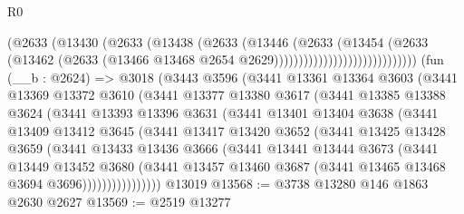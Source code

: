 \begin{lexlean}{R0}
\begin{coremodule}
                                      (@2633
                                        (@13430
                                          (@2633
                                            (@13438
                                              (@2633
                                                (@13446
                                                  (@2633
                                                    (@13454
                                                      (@2633
                                                        (@13462
                                                          (@2633
                                                            (@13466
                                                              @13468
                                                              @2654
                                                              @2629)))))))))))))))))))))))))))))
    (fun (__b : @2624) =>
    @3018
      (@3443
        @3596
        (@3441
          @13361
          @13364
          @3603
          (@3441
            @13369
            @13372
            @3610
            (@3441
              @13377
              @13380
              @3617
              (@3441
                @13385
                @13388
                @3624
                (@3441
                  @13393
                  @13396
                  @3631
                  (@3441
                    @13401
                    @13404
                    @3638
                    (@3441
                      @13409
                      @13412
                      @3645
                      (@3441
                        @13417
                        @13420
                        @3652
                        (@3441
                          @13425
                          @13428
                          @3659
                          (@3441
                            @13433
                            @13436
                            @3666
                            (@3441
                              @13441
                              @13444
                              @3673
                              (@3441
                                @13449
                                @13452
                                @3680
                                (@3441
                                  @13457
                                  @13460
                                  @3687
                                  (@3441 @13465 @13468 @3694 @3696))))))))))))))))
    @13019
@13568 := @3738 @13280 @146 @1863 @2630 @2627
@13569 := @2519 @13277

\end{coremodule}
\end{lexlean}
